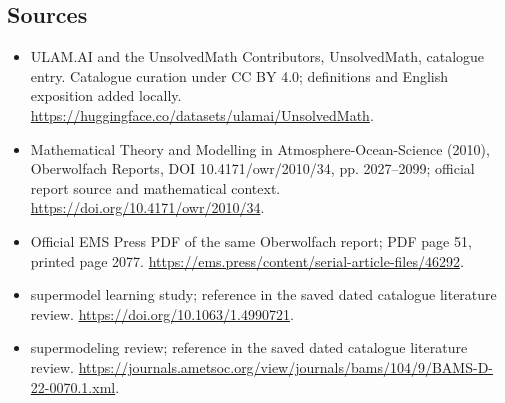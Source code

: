 \documentclass[11pt]{article}
\begin{document}
\subsection{Sources}
\begin{itemize}
\item[\hypertarget{source:statement:1}{S1}] ULAM.AI and the UnsolvedMath Contributors, UnsolvedMath, catalogue entry. Catalogue curation under CC BY 4.0; definitions and English exposition added locally.
\url{https://huggingface.co/datasets/ulamai/UnsolvedMath}.
\item[\hypertarget{source:statement:2}{S2}] Mathematical Theory and Modelling in Atmosphere-Ocean-Science (2010), Oberwolfach Reports, DOI 10.4171/owr/2010/34, pp. 2027--2099; official report source and mathematical context.
\url{https://doi.org/10.4171/owr/2010/34}.
\item[\hypertarget{source:statement:3}{S3}] Official EMS Press PDF of the same Oberwolfach report; PDF page 51, printed page 2077.
\url{https://ems.press/content/serial-article-files/46292}.
\item[\hypertarget{source:statement:4}{S4}] supermodel learning study; reference in the saved dated catalogue literature review.
\url{https://doi.org/10.1063/1.4990721}.
\item[\hypertarget{source:statement:5}{S5}] supermodeling review; reference in the saved dated catalogue literature review.
\url{https://journals.ametsoc.org/view/journals/bams/104/9/BAMS-D-22-0070.1.xml}.
\end{itemize}
\label{end:statement}
\end{document}
